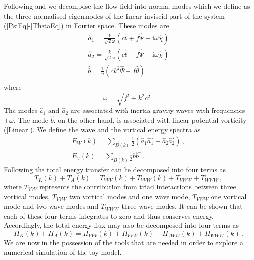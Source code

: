  Following \citet{Bartello:1995} and \citet{Dritschel2001} we decompose the flow field into normal  modes which we define as the three normalised eigenmodes of the linear inviscid part of the system (\ref{PsiEq}-\ref{ThetaEq}) in Fourier space. These modes are
\begin{eqnarray}
\widehat{a}_{1} = \frac{k}{\sqrt{2} \omega} ( c \widehat{\theta} + f \widehat{\Psi} - {\mbox{i}} \omega \widehat{\chi} )  \\
\widehat{a}_{2} =  \frac{k}{\sqrt{2} \omega} ( c \widehat{\theta} - f \widehat{\Psi} + {\mbox{i}} \omega \widehat{\chi} ) \\
\widehat{b} =  \frac{1}{\omega} (c k^2 \widehat{\Psi}-f \widehat{\theta}   ) \\
\end{eqnarray} 
where
\begin{equation} \label{Dispersion}
\omega =  \sqrt{f^2+k^2c^2}  \, .
\end{equation} 
The modes $ \widehat{a}_{1} $ and $ \widehat{a}_{2} $ are associated with inertia-gravity waves with frequencies $ \pm \omega $. 
The mode $ \widehat{b} $, on the other hand,  is associated with linear potential vorticity (\ref{Linear}). 
We define the wave and the vortical energy spectra as
\begin{eqnarray}
E_{W}(k) = \sum_{B(k)} \frac{1}{2}(\widehat{a}_{1} \widehat{a}_{1}^{\star} + \widehat{a}_{2} \widehat{a}_{2}^{\star} ) \, , \\
E_{V}(k) =  \sum_{B(k)} \frac{1}{2} \widehat{b} \widehat{b} ^{\star} \, .
\end{eqnarray} 
{ \noindent Following \citet{Deusebio-Augier-Lindborg:2013} the total energy transfer can be decomposed into four terms as
\begin{equation}
T_K(k) + T_A(k) = T_{VVV}(k) + T_{VVW}(k) + T_{VWW} + T_{WWW} \, ,
\end{equation} 
where 
$ T_{VVV} $ represents the contribution from triad interactions between three vortical modes, $ T_{VVW} $  two vortical modes and one wave mode,  $ T_{VWW} $ one vortical mode and two wave modes and $ T_{WWW} $ three wave modes.  It can be shown that each of these four  terms integrates to zero and  thus conserves energy. Accordingly, the total energy flux may  also be decomposed into four terms as
\begin{equation} \label{Decomposition}
\Pi_K(k) + \Pi_A(k) = \Pi_{VVV}(k)+ \Pi_{VVW}(k)+\Pi_{VWW}(k)+ \Pi_{WWW}(k) \, .
\end{equation} }
\noindent We are now in the possession of the tools that are needed in order to explore a numerical simulation of the toy model. 

